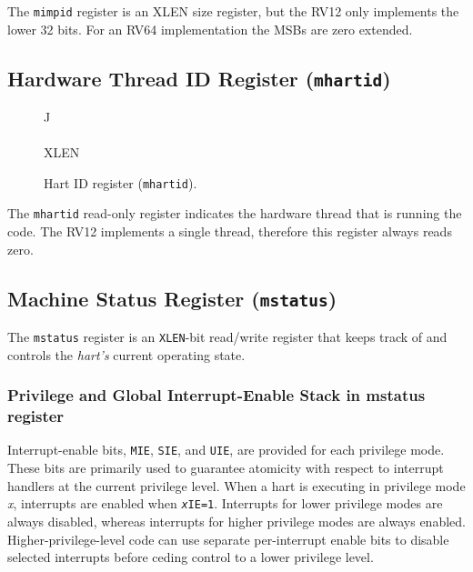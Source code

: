\fi

The \texttt{mimpid} register is an XLEN size register, but the RV12 only
implements the lower 32 bits. For an RV64 implementation the MSBs are
zero extended.

\subsection{Hardware Thread ID Register
(\texttt{mhartid})}\label{hardware-thread-id-register-mhartid}

\ifdefined\MARKDOWN
\else

\begin{figure*}[htb]
	{\footnotesize
		\begin{center}
			\begin{tabular}{J}
				 \\
				\hline
				\\
				\hline
				XLEN \\
			\end{tabular}
		\end{center}
	}
	\vspace{-0.1in}
	\caption{Hart ID register (\texttt{mhartid}).}
	\label{fig:mhartidreg}
\end{figure*}

\fi

The \texttt{mhartid} read-only register indicates the hardware thread that is
running the code. The RV12 implements a single thread, therefore this
register always reads zero.

\subsection{Machine Status Register
(\texttt{mstatus})}\label{machine-status-register-mstatus}

The \texttt{mstatus} register is an \texttt{XLEN}-bit read/write register that keeps track
of and controls the \emph{hart's} current operating state.

\subsubsection{Privilege and Global Interrupt-Enable Stack in mstatus register}

Interrupt-enable bits, \texttt{MIE}, \texttt{SIE}, and \texttt{UIE}, are provided for each
privilege mode. These bits are primarily used to guarantee atomicity
with respect to interrupt handlers at the current privilege level. When
a hart is executing in privilege mode \emph{x}, interrupts are enabled
when \texttt{\emph{x}IE=1}. Interrupts for lower privilege modes are always
disabled, whereas interrupts for higher privilege modes are always
enabled. Higher-privilege-level code can use separate per-interrupt
enable bits to disable selected interrupts before ceding control to a
lower privilege level.

